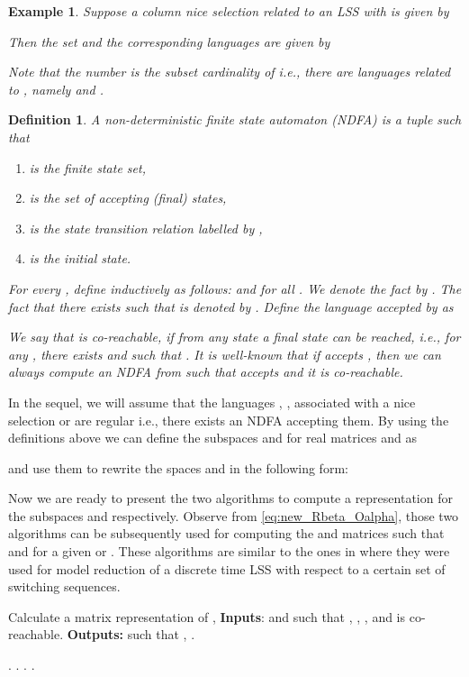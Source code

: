 \documentclass[journal]{IEEEtran}
\newtheorem{Definition}{Definition}
\newtheorem{Example}{Example}
\begin{document}
\begin{Example}
	Suppose a column nice selection  related to an LSS  with  is given by
	
	Then the set  and the corresponding languages  are given by
	
	Note that the number  is the subset cardinality of  i.e., there are  languages related to , namely  and .
\end{Example}

\begin{Definition} \label{def:NDFA}
	A non-deterministic finite state automaton (NDFA) is a tuple  such that
	\begin{enumerate}
		\item  is the finite state set,
		\item  is the set of accepting (final) states,
		\item  is the state transition relation labelled by ,
		\item  is the initial state.
	\end{enumerate}
	For every , define  inductively as follows:  and  for all . We denote the fact  by . The fact that there exists  such that  is denoted by . Define the language  accepted by  as 
	
	We say that  is \emph{co-reachable}, if from any state a final state can be reached, i.e., for any , there exists  and  such that . It is well-known that if  accepts , then we can always compute an NDFA  from  such that  accepts  and it is co-reachable.
\end{Definition}

In the sequel, we will assume that the languages , ,  associated with a nice selection  or  are regular i.e., there exists an NDFA accepting them. By using the definitions above  we can define the subspaces  and  for real matrices  and  as

and use them to rewrite the spaces  and  in the following form:


Now we are ready to present the two algorithms to compute a representation for the subspaces  and  respectively. Observe from \eqref{eq:new_Rbeta_Oalpha}, those two algorithms can be subsequently used for computing the  and  matrices such that  and  for a given  or . These algorithms are similar to the ones in \cite{bastugCDC2014} where they were used for model reduction of a discrete time LSS with respect to a certain set of switching sequences.

\begin{algorithm}
	\caption{
		Calculate  a matrix representation of , 
		\newline
		\textbf{Inputs}:  and  such that , , ,  and   is co-reachable.
		\newline
		\textbf{Outputs:}  such that ,
		. 
	}
	\label{alg4}
	\begin{algorithmic}[1]
		\STATE .
		\STATE .
		\label{alg4.0}
		\STATE .
\WHILE{}
		\label{alg4.1}
		\STATE 
		\FOR{}
		\STATE  
		\FOR{}
		\STATE 
		\ENDFOR
		\STATE 
		\ENDFOR
		\IF{)}
		\ENDIF 
		\ENDWHILE
		\RETURN .
	\end{algorithmic}
\end{algorithm}
\end{document}
